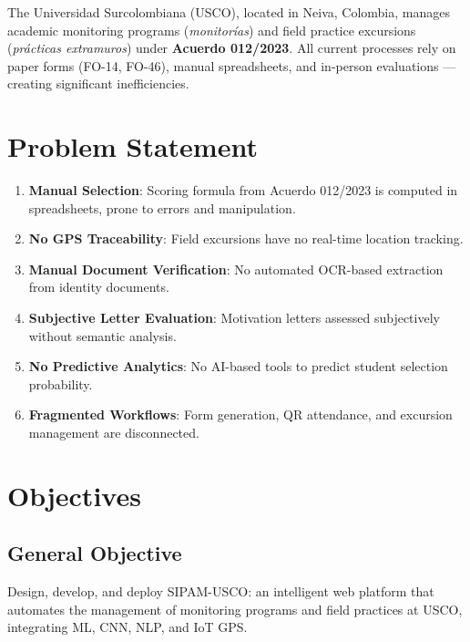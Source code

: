 \documentclass[12pt,a4paper,twoside]{report}
\begin{document}
The Universidad Surcolombiana (USCO), located in Neiva, Colombia, manages academic monitoring
programs (\textit{monitorías}) and field practice excursions (\textit{prácticas extramuros}) under
\textbf{Acuerdo 012/2023}. All current processes rely on paper forms (FO-14, FO-46), manual
spreadsheets, and in-person evaluations — creating significant inefficiencies.

\section{Problem Statement}

\begin{enumerate}[label=\textbf{P\arabic*.},leftmargin=*]
\item \textbf{Manual Selection}: Scoring formula from Acuerdo 012/2023 is computed in spreadsheets, prone to errors and manipulation.
\item \textbf{No GPS Traceability}: Field excursions have no real-time location tracking.
\item \textbf{Manual Document Verification}: No automated OCR-based extraction from identity documents.
\item \textbf{Subjective Letter Evaluation}: Motivation letters assessed subjectively without semantic analysis.
\item \textbf{No Predictive Analytics}: No AI-based tools to predict student selection probability.
\item \textbf{Fragmented Workflows}: Form generation, QR attendance, and excursion management are disconnected.
\end{enumerate}

\section{Objectives}

\subsection{General Objective}
Design, develop, and deploy SIPAM-USCO: an intelligent web platform that automates the management
of monitoring programs and field practices at USCO, integrating ML, CNN, NLP, and IoT GPS.
\end{document}

